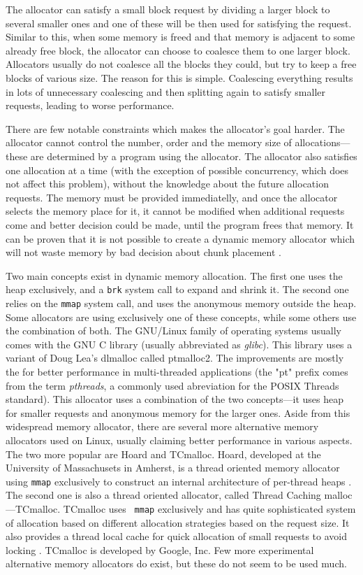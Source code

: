 The allocator can satisfy a small block request by dividing a larger block to
several smaller ones and one of these will be then used for satisfying the
request. Similar to this, when some memory is freed and that memory is adjacent
to some already free block, the allocator can choose to coalesce them to one
larger block. Allocators usually do not coalesce all the blocks they could, but
try to keep a free blocks of various size. The reason for this is simple.
Coalescing everything results in lots of unnecessary coalescing and then
splitting again to satisfy smaller requests, leading to worse performance.

There are few notable constraints which makes the allocator's goal harder. The
allocator cannot control the number, order and the memory size of
allocations---these are determined by a program using the allocator. The
allocator also satisfies one allocation at a time (with the exception of possible
concurrency, which does not affect this problem), without the knowledge about the
future allocation requests. The memory must be provided immediatelly, and once
the allocator selects the memory place for it, it cannot be modified when
additional requests come and better decision could be made, until the program
frees that memory. It can be proven that it is not possible to create a dynamic
memory allocator which will not waste memory by bad decision about chunk
placement \cite{DSAsurvey}.

Two main concepts exist in dynamic memory allocation. The first one uses the heap
exclusively, and a {\tt brk} system call to expand and shrink it. The second one
relies on the {\tt mmap} system call, and uses the anonymous memory outside the
heap. Some allocators are using exclusively one of these concepts, while some
others use the combination of both. The GNU/Linux family of operating systems
usually comes with the GNU C library (usually abbreviated as {\em glibc}). This
library uses a variant of Doug Lea's dlmalloc called ptmalloc2. The improvements
are mostly the for better performance in multi-threaded applications (the "pt"
prefix comes from the term {\em pthreads}, a commonly used abreviation for the
POSIX Threads standard). This allocator uses a combination of the two
concepts---it uses heap for smaller requests and anonymous memory for the larger
ones. Aside from this widespread memory allocator, there are several more
alternative memory allocators used on Linux, usually claiming better performance
in various aspects. The two more popular are Hoard and TCmalloc. Hoard, developed
at the University of Massachusets in Amherst, is a thread oriented memory
allocator using {\tt mmap} exclusively to construct an internal architecture of
per-thread heaps \cite{allocators:hoard}. The second one is also a thread
oriented allocator, called Thread Caching malloc---TCmalloc. TCmalloc uses {\tt
mmap} exclusively and has quite sophisticated system of allocation based on
different allocation strategies based on the request size. It also provides a
thread local cache for quick allocation of small requests to avoid locking
\cite{allocators:tcmalloc}. TCmalloc is developed by Google, Inc. Few more experimental
alternative memory allocators do exist, but these do not seem to be used much.

